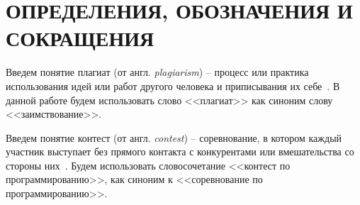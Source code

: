 \section*{ОПРЕДЕЛЕНИЯ, ОБОЗНАЧЕНИЯ И СОКРАЩЕНИЯ}

Введем понятие плагиат (от англ. \textit{plagiarism}) --  процесс или практика использования идей или работ другого человека и приписывания их себе~\cite{plagiat}. В данной работе будем использовать слово <<плагиат>> как синоним слову <<заимствование>>.

Введем понятие контест (от англ. \textit{contest}) --  соревнование, в котором каждый участник выступает без прямого контакта с конкурентами или вмешательства со стороны них~\cite{contest}. Будем использовать словосочетание <<контест по программированию>>, как синоним к <<соревнование по программированию>>.

\pagebreak